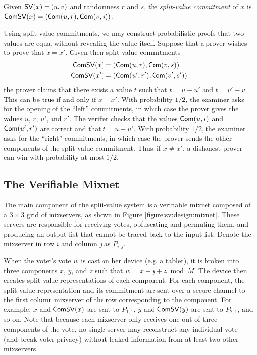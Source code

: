 \begin{definition}
Given $\operatorname{\mathsf{SV}}(x) = (u, v)$ and randomness $r$ and $s$, the \emph{split-value commitment} of $x$ is $\operatorname{\mathsf{ComSV}}(x) = (\operatorname{\mathsf{Com}}(u, r), \operatorname{\mathsf{Com}}(v, s))$.
\end{definition}

Using split-value commitments, we may construct probabilistic proofs that two values are equal without revealing the value itself. Suppose that a prover wishes to prove that $x = x'$. Given their split value commitments
\begin{align*}
\operatorname{\mathsf{ComSV}}(x) &= (\operatorname{\mathsf{Com}}(u, r), \operatorname{\mathsf{Com}}(v, s)) \\
\operatorname{\mathsf{ComSV}}(x') &= (\operatorname{\mathsf{Com}}(u', r'), \operatorname{\mathsf{Com}}(v', s'))
\end{align*}
the prover claims that there exists a value $t$ such that $t = u - u'$ and $t = v' - v$. This can be true if and only if $x = x'$. With probability $1/2$, the examiner asks for the opening of the ``left'' commitments, in which case the prover gives the values $u$, $r$, $u'$, and $r'$. The verifier checks that the values $\operatorname{\mathsf{Com}}(u, r)$ and $\operatorname{\mathsf{Com}}(u', r')$ are correct and that $t = u - u'$. With probability $1/2$, the examiner asks for the ``right'' commitments, in which case the prover sends the other components of the split-value commitment. Thus, if $x \neq x'$, a dishonest prover can win with probability at most $1/2$.

\subsection{The Verifiable Mixnet} \label{sv:design:mixnet}

The main component of the split-value system is a verifiable mixnet composed of a $3 \times 3$ grid of mixservers, as shown in Figure \ref{figure:sv:design:mixnet}. These servers are responsible for receiving votes, obfuscating and permuting them, and producing an output list that cannot be traced back to the input list. Denote the mixserver in row $i$ and column $j$ as $P_{i,j}$.

When the voter's vote $w$ is cast on her device (e.g. a tablet), it is broken into three components $x$, $y$, and $z$ such that $w = x+y+z \bmod M$. The device then creates split-value representations of each component. For each component, the split-value representation and its commitment are sent over a secure channel to the first column mixserver of the row corresponding to the component. For example, $x$ and $\operatorname{\mathsf{ComSV}}(x)$ are sent to $P_{1,1}$, $y$ and $\operatorname{\mathsf{ComSV}}(y)$ are sent to $P_{2,1}$, and so on. Note that because each mixserver only receives one out of three components of the vote, no single server may reconstruct any individual vote (and break voter privacy) without leaked information from at least two other mixservers.

